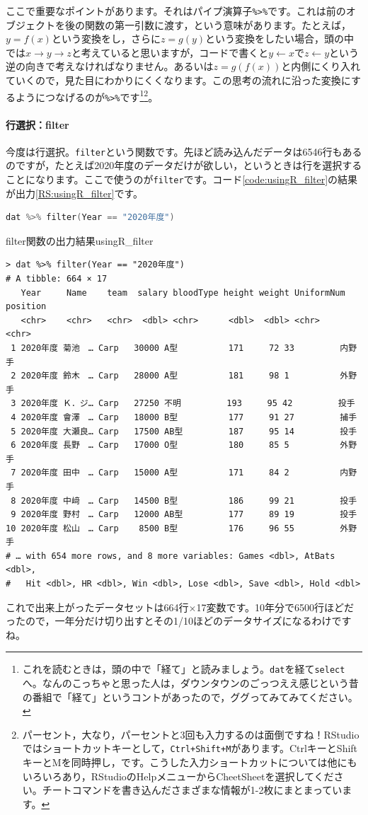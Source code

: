 \documentclass{ltjsbook}
\begin{document}
ここで重要なポイントがあります。それはパイプ演算子\verb|%>%|です。これは前のオブジェクトを後の関数の第一引数に渡す，という意味があります。たとえば，$y=f(x)$という変換をし，さらに$z=g(y)$という変換をしたい場合，頭の中では$x\to y \to z$と考えていると思いますが，コードで書くと$y \leftarrow x$で$z \leftarrow y$という逆の向きで考えなければなりません。あるいは$z=g(f(x))$と内側にくり入れていくので，見た目にわかりにくくなります。この思考の流れに沿った変換にするようにつなげるのが\verb|%>%|です\footnote{これを読むときは，頭の中で「経て」と読みましょう。\verb|dat|を経て\verb|select|へ。なんのこっちゃと思った人は，ダウンタウンのごっつええ感じという昔の番組で「経て」というコントがあったので，ググってみてみてください。}\footnote{パーセント，大なり，パーセントと3回も入力するのは面倒ですね！RStudioではショートカットキーとして，\verb|Ctrl+Shift+M|があります。CtrlキーとShiftキーとMを同時押し，です。こうした入力ショートカットについては他にもいろいろあり，RStudioのHelpメニューからCheetSheetを選択してください。チートコマンドを書き込んださまざまな情報が1-2枚にまとまっています。}。

\paragraph{行選択：filter}
今度は行選択。\verb|filter|という関数です。先ほど読み込んだデータは6546行もあるのですが，たとえば2020年度のデータだけが欲しい，というときは行を選択することになります。ここで使うのが\verb|filter|です。コード\ref{code:usingR_filter}の結果が出力\ref{RS:usingR_filter}です。
\begin{lstlisting}[language=c++,label={code:usingR_filter},caption={filter関数}]
dat %>% filter(Year == "2020年度")
\end{lstlisting}
\begin{Rscreen}{filter関数の出力結果}{usingR_filter}
	\begin{verbatim}
> dat %>% filter(Year == "2020年度")
# A tibble: 664 × 17
   Year     Name    team  salary bloodType height weight UniformNum position
   <chr>    <chr>   <chr>  <dbl> <chr>      <dbl>  <dbl> <chr>      <chr>   
 1 2020年度 菊池　… Carp   30000 A型          171     72 33         内野手  
 2 2020年度 鈴木　… Carp   28000 A型          181     98 1          外野手  
 3 2020年度 Ｋ．ジ… Carp   27250 不明         193     95 42         投手    
 4 2020年度 會澤　… Carp   18000 B型          177     91 27         捕手    
 5 2020年度 大瀬良… Carp   17500 AB型         187     95 14         投手    
 6 2020年度 長野　… Carp   17000 O型          180     85 5          外野手  
 7 2020年度 田中　… Carp   15000 A型          171     84 2          内野手  
 8 2020年度 中﨑　… Carp   14500 B型          186     99 21         投手    
 9 2020年度 野村　… Carp   12000 AB型         177     89 19         投手    
10 2020年度 松山　… Carp    8500 B型          176     96 55         外野手  
# … with 654 more rows, and 8 more variables: Games <dbl>, AtBats <dbl>,
#   Hit <dbl>, HR <dbl>, Win <dbl>, Lose <dbl>, Save <dbl>, Hold <dbl>
\end{verbatim}
\end{Rscreen}
これで出来上がったデータセットは664行$\times$17変数です。10年分で6500行ほどだったので，一年分だけ切り出すとその1/10ほどのデータサイズになるわけですね。
\end{document}
